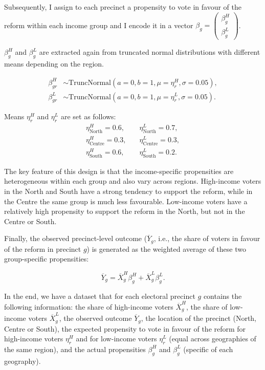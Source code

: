 Subsequently, I assign to each precinct a propensity to vote in favour of the reform within each income group and I encode it in a vector $ \beta_g = \begin{pmatrix}
\beta_g^H \\
\beta_g^L
\end{pmatrix}$.

$\beta_g^H$ and $\beta_g^L$ are extracted again from truncated normal distributions with different means depending on the region.

\begin{align*}
\beta_{gr}^{H} &\sim \text{TruncNormal}(a=0, b=1, \mu=\eta_{r}^{H}, \sigma=0.05), \\
\beta_{gr}^{L} &\sim \text{TruncNormal}(a=0, b=1, \mu=\eta_{r}^{L}, \sigma=0.05).
\end{align*}

Means $\eta_{r}^{H}$ and $\eta_{r}^{L}$ are set as follows:
\begin{align*}
\eta_{\text{North}}^{H} = 0.6, \quad & \eta_{\text{North}}^{L} = 0.7, \\
\eta_{\text{Centre}}^{H} = 0.3, \quad & \eta_{\text{Centre}}^{L} = 0.3, \\
\eta_{\text{South}}^{H} = 0.6, \quad & \eta_{\text{South}}^{L} = 0.2.
\end{align*}

The key feature of this design is that the income-specific propensities are heterogeneous within each group and also vary across regions. High-income voters in the North and South have a strong tendency to support the reform, while in the Centre the same group is much less favourable. Low-income voters have a relatively high propensity to support the reform in the North, but not in the Centre or South.

Finally, the observed precinct-level outcome ($\overline{Y}_{g}$, i.e., the share of voters in favour of the reform in precinct $g$) is generated as the weighted average of these two group-specific propensities:

\begin{equation*}
\overline{Y}_{g}=\overline{X}_{g}^{H}\beta_{g}^{H}+\overline{X}_{g}^{L}\beta_{g}^{L}.
\end{equation*}

In the end, we have a dataset that for each electoral precinct $g$ contains the following information: the share of high-income voters $\overline{X}_{g}^{H}$, the share of low-income voters $\overline{X}_{g}^{L}$, the observed outcome $\overline{Y}_{g}$, the location of the precinct (North, Centre or South), the expected propensity to vote in favour of the reform for high-income voters $\eta_{r}^{H}$ and for low-income voters $\eta_{r}^{L}$ (equal across geographies of the same region), and the actual propensities $\beta_{g}^{H}$ and $\beta_{g}^{L}$ (specific of each geography).

